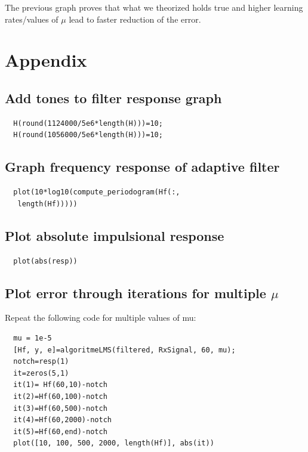 \documentclass[conference,9pt]{IEEEtran}
\begin{document}
The previous graph proves that what we theorized holds true and higher learning rates/values of $\mu$ lead to faster reduction of the error.

\section{Appendix}
\subsection{Add tones to filter response graph}
\begin{verbatim}
  H(round(1124000/5e6*length(H)))=10;
  H(round(1056000/5e6*length(H)))=10;
\end{verbatim}

\subsection{Graph frequency response of adaptive filter}
\begin{verbatim}
  plot(10*log10(compute_periodogram(Hf(:,
   length(Hf)))))
\end{verbatim}

\subsection{Plot absolute impulsional response}
\begin{verbatim}
  plot(abs(resp))
\end{verbatim}

\subsection{Plot error through iterations for multiple $\mu$}
Repeat the following code for multiple values of mu:
\begin{verbatim}
  mu = 1e-5
  [Hf, y, e]=algoritmeLMS(filtered, RxSignal, 60, mu);
  notch=resp(1)
  it=zeros(5,1)
  it(1)= Hf(60,10)-notch
  it(2)=Hf(60,100)-notch
  it(3)=Hf(60,500)-notch
  it(4)=Hf(60,2000)-notch
  it(5)=Hf(60,end)-notch
  plot([10, 100, 500, 2000, length(Hf)], abs(it))
\end{verbatim}
\end{document}
